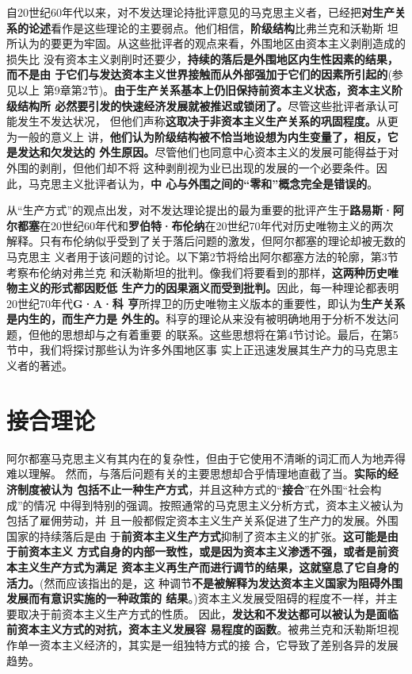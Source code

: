 自20世纪60年代以来，对不发达理论持批评意见的马克思主义者，已经把\textbf{对生产关
  系的论述}看作是这些理论的主要弱点。他们相信，\textbf{阶级结构}比弗兰克和沃勒斯
坦所认为的要更为牢固。从这些批评者的观点来看，外围地区由资本主义剥削造成的损失比
没有资本主义剥削时还要少，\textbf{持续的落后是外围地区内生性因素的结果，而不是由
  于它们与发达资本主义世界接触而从外部强加于它们的因素所引起的}(参见以上
第9章第2节)。\textbf{由于生产关系基本上仍旧保持前资本主义状态，资本主义阶级结构所
  必然要引发的快速经济发展就被推迟或锁闭了。}尽管这些批评者承认可能发生不发达状况，
但他们声称\textbf{这取决于非资本主义生产关系的巩固程度。}从更为一般的意义上
讲，\textbf{他们认为阶级结构被不恰当地设想为内生变量了，相反，它是发达和欠发达的
  外生原因。}尽管他们也同意中心资本主义的发展可能得益于对外围的剥削，但他们却不将
这种剥削视为业已出现的发展的一个必要条件。因此，马克思主义批评者认为，\textbf{中
  心与外围之间的“零和”概念完全是错误的}。

从“生产方式”的观点出发，对不发达理论提出的最为重要的批评产生于\textbf{路易斯·阿
  尔都塞}在20世纪60年代和\textbf{罗伯特·布伦纳}在20世纪70年代对历史唯物主义的两次
解释。只有布伦纳似乎受到了关于落后问题的激发，但阿尔都塞的理论却被无数的马克思主
义者用于该问题的讨论。以下第2节将给出阿尔都塞方法的轮廓，第3节考察布伦纳对弗兰克
和沃勒斯坦的批判。像我们将要看到的那样，\textbf{这两种历史唯物主义的形式都因贬低
  生产力的因果涵义而受到批判。}因此，每一种理论都表明20世纪70年代\textbf{G·A·科
  亨}所捍卫的历史唯物主义版本的重要性，即认为\textbf{生产关系是内生的，而生产力是
  外生的。}科亨的理论从来没有被明确地用于分析不发达问题，但他的思想却与之有着重要
的联系。这些思想将在第4节讨论。最后，在第5节中，我们将探讨那些认为许多外围地区事
实上正迅速发展其生产力的马克思主义者的著述。

\section{接合理论}

阿尔都塞马克思主义有其内在的复杂性，但由于它使用不清晰的词汇而人为地弄得难以理解。
然而，与落后问题有关的主要思想却合乎情理地直截了当。\textbf{实际的经济制度被认为
  包括不止一种生产方式}，并且这种方式的“\textbf{接合}”在外围“社会构成”的情况
中得到特别的强调。按照通常的马克思主义分析方式，资本主义被认为包括了雇佣劳动，并
且一般都假定资本主义生产关系促进了生产力的发展。外围国家的持续落后是由
于\textbf{前资本主义生产方式}抑制了资本主义的扩张。\textbf{这可能是由于前资本主义
  方式自身的内部一致性，或是因为资本主义渗透不强，或者是前资本主义生产方式为满足
  资本主义再生产而进行调节的结果，这就窒息了它自身的活力。}(然而应该指出的是，这
种调节\textbf{不是被解释为发达资本主义国家为阻碍外围发展而有意识实施的一种政策的
  结果}。)资本主义发展受阻碍的程度不一样，并主要取决于前资本主义生产方式的性质。
因此，\textbf{发达和不发达都可以被认为是面临前资本主义方式的对抗，资本主义发展容
  易程度的函数}。被弗兰克和沃勒斯坦视作单一资本主义经济的，其实是一组独特方式的接
合，它导致了差别各异的发展趋势。

